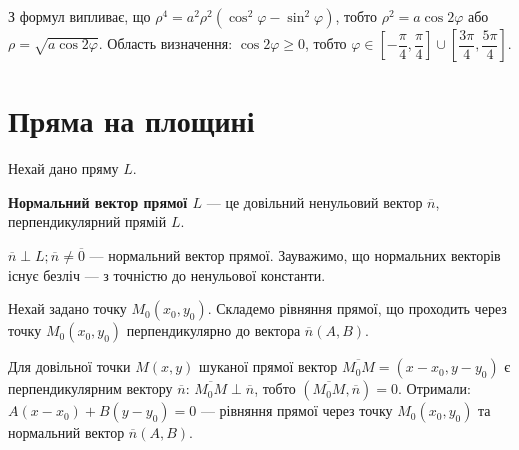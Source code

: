 \parbox{140px}{}
\parbox{7.2cm}{З формул випливає, що
	$\rho^4 = a^2\rho^2(\cos^2 \varphi - \sin^2 \varphi)$, тобто
	$\rho^2 = a\cos 2 \varphi$ або $\rho = \sqrt{a\cos 2 \varphi}$.
	Область визначення: $\cos 2\varphi \geqslant0$,
	тобто $\varphi \in \left[-\dfrac{\pi}{4}, \dfrac{\pi}{4}\right] \cup \left[\dfrac{3\pi}{4}, \dfrac{5\pi}{4}\right]$.
}

\section{Пряма на площині}

Нехай дано пряму $L$.

\begin{definition}
	\textbf{Нормальний вектор прямої $L$} --- це довільний ненульовий вектор $\overline{n}$, перпендикулярний прямій $L$.
\end{definition}

\parbox{80px}{}
\parbox{9.3cm}{$\overline{n} \perp L; \overline{n} \neq \overline{0}$ --- нормальний вектор прямої.
Зауважимо, що нормальних векторів існує безліч --- з точністю до ненульової константи.}

Нехай задано точку $M_0(x_0, y_0)$. Складемо рівняння прямої, що проходить
через точку $M_0(x_0, y_0)$ перпендикулярно до вектора $\overline{n}(A, B)$.

Для довільної точки $M(x, y)$ шуканої прямої вектор $\overline{M_0 M} = (x-x_0, y-y_0)$ є
перпендикулярним вектору $\overline{n}$: $\overline{M_0 M} \perp \overline{n}$, тобто $(\overline{M_0 M}, \overline{n}) = 0$. Отримали:
$A(x-x_0) + B(y-y_0) = 0$ --- рівняння прямої через точку $M_0(x_0, y_0)$ та нормальний вектор $\overline{n}(A, B)$.

